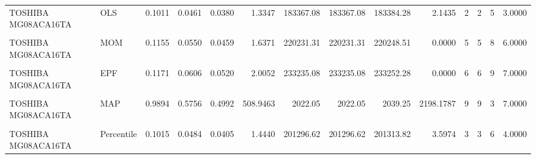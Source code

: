 \documentclass[
]{article}
\begin{document}
\begin{longtable}[t]{llrrrrrrrrrrrr}
TOSHIBA MG08ACA16TA & OLS & 0.1011 & 0.0461 & 0.0380 & 1.3347 & 183367.08 & 183367.08 & 183384.28 & 2.1435 & 2 & 2 & 5 & 3.0000\\
\addlinespace
\cellcolor{gray!10}{TOSHIBA MG08ACA16TA} & \cellcolor{gray!10}{WLS} & \cellcolor{gray!10}{0.0944} & \cellcolor{gray!10}{0.0440} & \cellcolor{gray!10}{0.0360} & \cellcolor{gray!10}{1.2738} & \cellcolor{gray!10}{183248.73} & \cellcolor{gray!10}{183248.73} & \cellcolor{gray!10}{183265.93} & \cellcolor{gray!10}{3.3479} & \cellcolor{gray!10}{1} & \cellcolor{gray!10}{1} & \cellcolor{gray!10}{4} & \cellcolor{gray!10}{2.0000}\\
TOSHIBA MG08ACA16TA & MOM & 0.1155 & 0.0550 & 0.0459 & 1.6371 & 220231.31 & 220231.31 & 220248.51 & 0.0000 & 5 & 5 & 8 & 6.0000\\
\cellcolor{gray!10}{TOSHIBA MG08ACA16TA} & \cellcolor{gray!10}{L-Moments} & \cellcolor{gray!10}{0.1148} & \cellcolor{gray!10}{0.0525} & \cellcolor{gray!10}{0.0433} & \cellcolor{gray!10}{1.4942} & \cellcolor{gray!10}{213201.08} & \cellcolor{gray!10}{213201.08} & \cellcolor{gray!10}{213218.28} & \cellcolor{gray!10}{0.0000} & \cellcolor{gray!10}{4} & \cellcolor{gray!10}{4} & \cellcolor{gray!10}{7} & \cellcolor{gray!10}{5.0000}\\
TOSHIBA MG08ACA16TA & EPF & 0.1171 & 0.0606 & 0.0520 & 2.0052 & 233235.08 & 233235.08 & 233252.28 & 0.0000 & 6 & 6 & 9 & 7.0000\\
\cellcolor{gray!10}{TOSHIBA MG08ACA16TA} & \cellcolor{gray!10}{MLE} & \cellcolor{gray!10}{0.9897} & \cellcolor{gray!10}{0.5755} & \cellcolor{gray!10}{0.4990} & \cellcolor{gray!10}{483.6366} & \cellcolor{gray!10}{1984.96} & \cellcolor{gray!10}{1984.96} & \cellcolor{gray!10}{2002.16} & \cellcolor{gray!10}{21779.7631} & \cellcolor{gray!10}{7} & \cellcolor{gray!10}{7} & \cellcolor{gray!10}{1} & \cellcolor{gray!10}{5.0000}\\
\addlinespace
TOSHIBA MG08ACA16TA & MAP & 0.9894 & 0.5756 & 0.4992 & 508.9463 & 2022.05 & 2022.05 & 2039.25 & 2198.1787 & 9 & 9 & 3 & 7.0000\\
\cellcolor{gray!10}{TOSHIBA MG08ACA16TA} & \cellcolor{gray!10}{MCMC} & \cellcolor{gray!10}{0.9897} & \cellcolor{gray!10}{0.5755} & \cellcolor{gray!10}{0.4990} & \cellcolor{gray!10}{483.9352} & \cellcolor{gray!10}{1984.96} & \cellcolor{gray!10}{1984.96} & \cellcolor{gray!10}{2002.16} & \cellcolor{gray!10}{22134.5002} & \cellcolor{gray!10}{8} & \cellcolor{gray!10}{8} & \cellcolor{gray!10}{2} & \cellcolor{gray!10}{6.0000}\\
TOSHIBA MG08ACA16TA & Percentile & 0.1015 & 0.0484 & 0.0405 & 1.4440 & 201296.62 & 201296.62 & 201313.82 & 3.5974 & 3 & 3 & 6 & 4.0000\\

\end{longtable}
\end{document}
